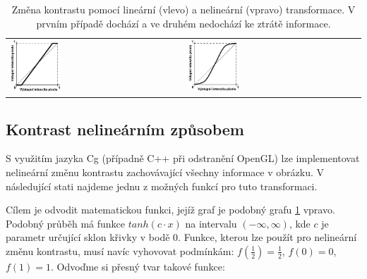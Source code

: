 \noindent
\begin{table}[ht]
	\captionsetup{tablename=Grafy}
	\caption{Změna kontrastu pomocí lineární (vlevo) a nelineární (vpravo) transformace. V prvním případě dochází a ve druhém nedochází ke ztrátě informace.}
	\label{table:kontrast}
	
		\begin{tabular}{p{}p{}}\centering
			\includegraphics[width=0.3\textwidth,height=0.3\textwidth]{Text/IMG/Kontrast_Transformace_1.jpg}
		&\centering
			\includegraphics[width=0.3\textwidth,height=0.3\textwidth]{Text/IMG/Kontrast_Transformace_2.jpg}
		\end{tabular}
\end{table}





\subsection{Kontrast nelineárním způsobem}
S využitím jazyka Cg (případně C++ při odstranění OpenGL) lze implementovat nelineární změnu kontrastu zachovávající všechny informace v obrázku. V následující stati najdeme jednu z možných funkcí pro tuto transformaci.

Cílem je odvodit matematickou funkci, jejíž graf je podobný grafu \ref{table:kontrast} vpravo. Podobný průběh má funkce $tanh(c\cdot x)$ na intervalu $(-\infty,\infty)$, kde $c$ je parametr určující sklon křivky v bodě $0$. Funkce, kterou lze použít pro nelineární změnu kontrastu, musí navíc vyhovovat podmínkám: $f(\frac{1}{2})=\frac{1}{2}$, $f(0)=0$, $f(1)=1$. Odvoďme si přesný tvar takové funkce:

